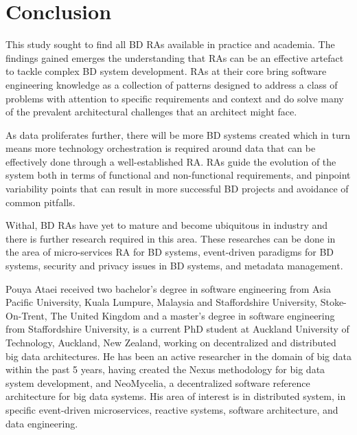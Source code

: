 \documentclass{ieeeaccess}
\begin{document}
\section{Conclusion}

This study sought to find all BD RAs available in practice and academia. The findings gained emerges the understanding that RAs can be an effective artefact to tackle complex BD system development. RAs at their core bring software engineering knowledge as a collection of patterns designed to address a class of problems with attention to specific requirements and context and do solve many of the prevalent architectural challenges that an architect might face. 

As data proliferates further, there will be more BD systems created which in turn means more technology orchestration is required around data that can be effectively done through a well-established RA. RAs guide the evolution of the system both in terms of functional and non-functional requirements, and pinpoint variability points that can result in more successful BD projects and avoidance of common pitfalls. 

Withal, BD RAs have yet to mature and become ubiquitous in industry and there is further research required in this area. These researches can be done in the area of micro-services RA for BD systems, event-driven paradigms for BD systems, security and privacy issues in BD systems, and metadata management.





\begin{IEEEbiography}{Pouya Ataei} received two bachelor's degree in software engineering from Asia Pacific University, Kuala Lumpure, Malaysia and Staffordshire University, Stoke-On-Trent, The United Kingdom and a master's degree in software engineering from Staffordshire University, is a current PhD student at Auckland University of Technology, Auckland, New Zealand, working on decentralized and distributed big data architectures. He has been an active researcher in the domain of big data within the past 5 years, having created the Nexus methodology for big data system development, and NeoMycelia, a decentralized software reference architecture for big data systems. His area of interest is in distributed system, in specific event-driven microservices, reactive systems, software architecture, and data engineering. \end{IEEEbiography}
 
\end{document}
